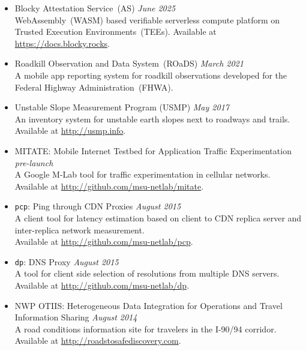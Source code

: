 \begin{itemize}
    \item Blocky Attestation Service~(AS)
    \hfill {\it June 2025} \\
    WebAssembly~(WASM) based verifiable serverless compute platform on Trusted
    Execution Environments~(TEEs).
    Available at \url{https://docs.blocky.rocks}.

    \item Roadkill Observation and Data System~(ROaDS)
    \hfill {\it March 2021}\\
    A mobile app reporting system for roadkill observations developed for the
    Federal Highway Administration~(FHWA).

    \item Unstable Slope Measurement Program (USMP)
    \hfill {\it May 2017}\\
    An inventory system for unstable earth slopes next to roadways and trails.\\
    Available at \url{http://usmp.info}.

    \item MITATE: Mobile Internet Testbed for Application Traffic
    Experimentation
    \hfill {\it pre-launch}\\
    A Google M-Lab tool for traffic experimentation in cellular networks. \\
    Available at \url{http://github.com/msu-netlab/mitate}.

    \item \texttt{pcp}: Ping through CDN Proxies
    \hfill {\it August 2015}\\
    A client tool for latency estimation based on client to CDN replica server
    and inter-replica network measurement. \\
    Available at \url{http://github.com/msu-netlab/pcp}.

    \item \texttt{dp}: DNS Proxy
    \hfill {\it August 2015}\\
    A tool for client side selection of resolutions from multiple DNS servers.\\
    Available at \url{http://github.com/msu-netlab/dp}.

    \item NWP OTIIS: Heterogeneous Data Integration for Operations and Travel
    Information Sharing
    \hfill {\it August 2014}\\
    A road conditions information site for travelers in the I-90/94 corridor.\\
    Available at \url{http://roadstosafediscovery.com}.

\end{itemize}


